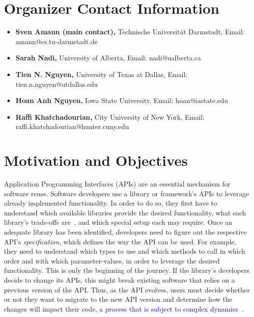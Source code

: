 \documentclass[10pt, conference]{IEEEtran}
\newcommand{\updated}[1]{{\textcolor{blue}{#1}}}
\begin{document}
\section{Organizer Contact Information}
\begin{itemize}
\setlength\itemsep{5pt}
\item \textbf{Sven Amann (main contact),} Technische Universit\"{a}t Darmstadt, Email: amann@cs.tu-darmstadt.de
\item \textbf{Sarah Nadi,} University of Alberta, Email: nadi@ualberta.ca
\item \textbf{Tien N. Nguyen,} University of Texas at Dallas, Email: tien.n.nguyen@utdallas.edu
\item \textbf{Hoan Anh Nguyen,} Iowa State University, Email: hoan@iastate.edu
\item \textbf{Raffi Khatchadourian,} City University of New York, Email: raffi.khatchadourian@hunter.cuny.edu
\end{itemize}

\section{Motivation and Objectives}
Application Programming Interfaces (APIs) are an essential mechanism for software reuse. Software developers use a library or framework's APIs to leverage already implemented functionality. In order to do so, they first have to understand which available libraries provide the desired functionality, what each library's trade-offs are\updated{~\cite{ZHHK17}}, and which special setup each may require. Once an adequate library has been identified, developers need to figure out the respective API's \textit{specification}, which defines the way the API can be used. For example, they need to understand which types to use and which methods to call in which order and with which parameter-values, in order to leverage the desired functionality. This is only the beginning of the journey. If the library's developers decide to change its APIs, this might break existing software that relies on a previous version of the API\@. Thus, as the API evolves, users must decide whether or not they want to migrate to the new API version and determine how the changes will impact their code\updated{, a process that is subject to complex dynamics~\cite{JKR+17}}.
\end{document}
